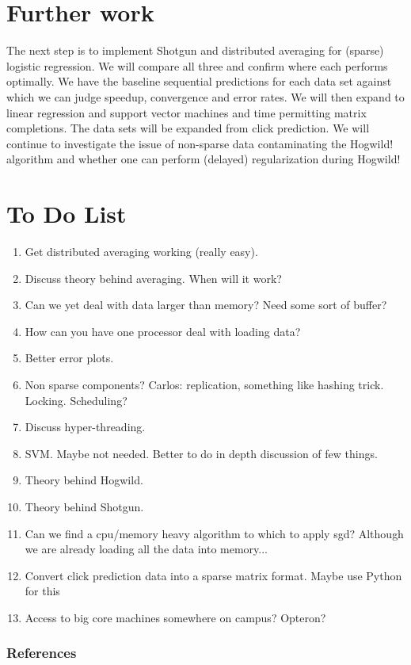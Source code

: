 \documentclass{article} %
\begin{document}
\section{Further work}
The next step is to implement Shotgun and distributed averaging for (sparse) logistic regression. We will compare all three and confirm where each performs optimally. We have the baseline sequential predictions for each data set against which we can judge speedup, convergence and error rates. We will then expand to linear regression and support vector machines and time permitting matrix completions. The data sets will be expanded from click prediction. We will continue to investigate the issue of non-sparse data contaminating the Hogwild! algorithm and whether one can perform (delayed) regularization during Hogwild!

\section{To Do List}
\begin{enumerate}
\item Get distributed averaging working (really easy).
\item Discuss theory behind averaging. When will it work?
\item Can we yet deal with data larger than memory? Need some sort of buffer?
\item How can you have one processor deal with loading data?
\item Better error plots.
\item Non sparse components? Carlos: replication, something like hashing trick. Locking. Scheduling?
\item Discuss hyper-threading.
\item SVM. Maybe not needed. Better to do in depth discussion of few things.
\item Theory behind Hogwild.
\item Theory behind Shotgun.
\item Can we find a cpu/memory heavy algorithm to which to apply sgd? Although we are already loading all the data into memory...
\item Convert click prediction data into a sparse matrix format. Maybe use Python for this
\item Access to big core machines somewhere on campus? Opteron?
\end{enumerate}


\subsubsection*{References}

\begingroup
\renewcommand{\section}[2]{}%


\endgroup
\end{document}
